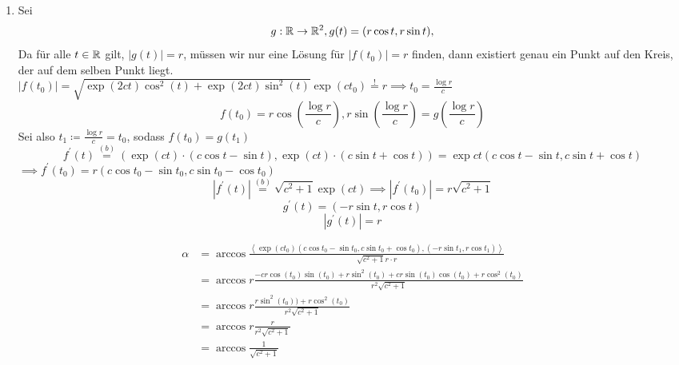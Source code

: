 \documentclass[sectionformat=aufgabe]{gadsescript}
\begin{document}
\begin{enumerate}[label=(\alph*)]
	\item Sei
		\[
			g : \mathbb{R} \to \mathbb{R} ^2, g(t) = (r\cos t, r\sin t),
		\]
		Da für alle $ t \in \mathbb{R}  $ gilt, $ \left| g(t) \right| = r $, müssen wir nur eine Lösung für $ \left| f(t_0) \right|  = r $ finden, dann existiert genau ein Punkt auf den Kreis, der auf dem selben Punkt liegt.\\
		$ \left| f(t_0) \right| = \sqrt{\exp (2ct) \cos ^2 (t) + \exp (2ct) \sin ^2(t)} \exp (ct_0) \overset{!}{=} r \implies t_0 = \frac{ \log r }{ c }  $
		\[
			f(t_0) = r \cos \left( \frac{\log r}{ c }  \right) , r \sin \left( \frac{\log r}{ c }  \right) = g\left( \frac{\log r}{ c }  \right)
		\]
		Sei also $ t_1 \coloneqq  \frac{ \log r }{ c } = t_0 $, sodass $ f(t_0) = g(t_1) $
		\[
			f^\prime(t) \overset{(b)}{=} (\exp (ct) \cdot (c \cos t - \sin t), \exp (ct) \cdot (c \sin t + \cos t)) = \exp ct (c \cos t - \sin t, c \sin t + \cos t)
		\]
		$ \implies f^\prime (t_0) = r ( c \cos t_0 - \sin t_0, c \sin t_0 - \cos t_0) $
		\[
			\left| f^\prime (t) \right| \overset{(b)}{=} \sqrt{c^2 + 1} \exp (ct) \implies \left| f^\prime (t_0) \right| = r \sqrt{c^2 + 1}
		\]
		\[
			g^\prime (t) = (-r \sin t, r \cos t)
		\]
		\[
			\left| g^\prime (t) \right| = r
		\]
		
		\begin{align*}
			\alpha &= \arccos \frac{ \left< \exp (ct_0) (c \cos t_0 - \sin t_0, c \sin t_0 + \cos t_0), (-r \sin t_1, r \cos t_1) \right> }{ \sqrt{c^2 + 1} r \cdot r } \\
			&= \arccos r \frac{-cr \cos (t_0) \sin (t_0) + r \sin ^2(t_0) + cr \sin (t_0) \cos (t_0) + r \cos ^2 (t_0) }{ r^2 \sqrt{c^2 + 1}  }  \\
			&= \arccos r \frac{r \sin ^2(t_0)) + r \cos ^2 (t_0) }{ r^2 \sqrt{c^2 + 1}  }  \\
			&= \arccos r \frac{ r }{ r^2 \sqrt{c^2 + 1}  }  \\
			&= \arccos \frac{ 1 }{ \sqrt{c^2 + 1}  }  \\
		\end{align*}
\end{enumerate}
\end{document}
